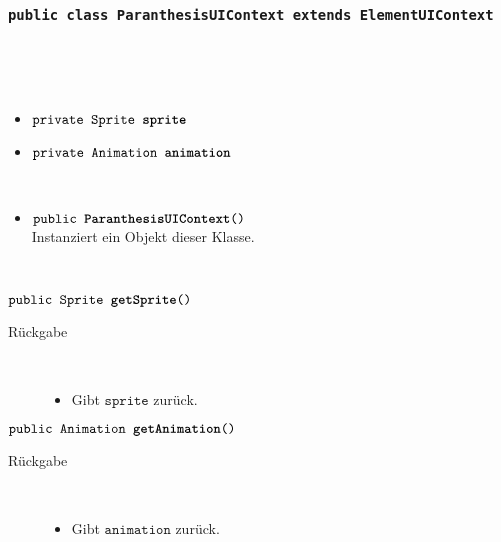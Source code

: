 		\subsubsection{\normalfont \texttt{public class \textbf{ParanthesisUIContext} extends ElementUIContext}}

\begin{description}
\item[Beschreibung] \hfill \\ 
\item[Attribute] \hfill \\
	\vspace{-.8cm}
	\begin{itemize}	
		\item $\texttt{private Sprite \textbf{sprite}}$ \\ 		
		\item $\texttt{private Animation \textbf{animation}}$ \\ 
		\end{itemize}
	
\item[Konstruktoren] \hfill \\
	\vspace{-.8cm}
	\begin{itemize}
		\item $\texttt{public \textbf{ParanthesisUIContext}()}$ \\ Instanziert ein Objekt dieser Klasse.

	\end{itemize}
	
\item[Methoden] \hfill \\
	\vspace{-.8cm}
		\item $\texttt{public Sprite \textbf{getSprite}()}$ \\ 
		\begin{description}
			\item[Rückgabe] \hfill \\
			\vspace{-.8cm}
			\begin{itemize}
				\item Gibt $\texttt{sprite}$ zurück.
			\end{itemize}
			\end{description}
			
		\item $\texttt{public Animation \textbf{getAnimation}()}$ \\ 
		\begin{description}
			\item[Rückgabe] \hfill \\
			\vspace{-.8cm}
			\begin{itemize}
				\item Gibt $\texttt{animation}$ zurück.
			\end{itemize}
			\end{description}
			
		
	\end{description}
			

